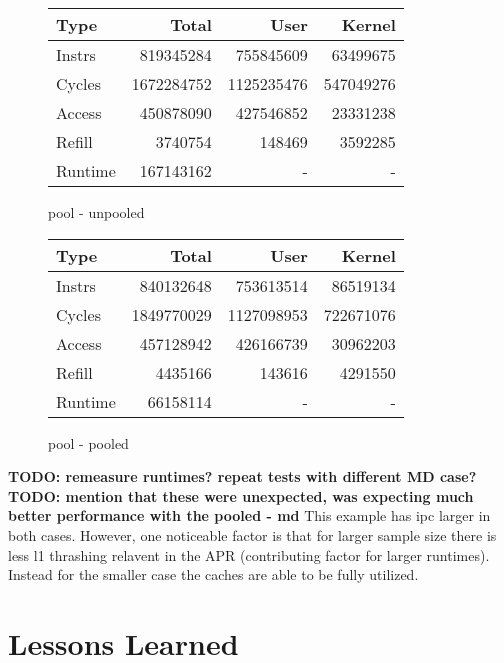 \documentclass[11pt]{article}
\begin{document}
\begin{figure*}[h]
	\begin{subtable}{.48\textwidth} 
		\centering
		\begin{tabular}{ l|rrr }
			Type    & Total      & User       & Kernel    \\
			\hline
			Instrs  & 819345284  & 755845609  & 63499675  \\
			Cycles  & 1672284752 & 1125235476 & 547049276 \\
			Access  & 450878090  & 427546852  & 23331238  \\
			Refill  & 3740754    & 148469     & 3592285   \\
			Runtime & 167143162  & -          & -         \\
			\hline
		\end{tabular}
		\caption{pool - unpooled}
	\end{subtable}
	\hfill
	\begin{subtable}{.48\textwidth} 
		\centering
		\begin{tabular}{ l|rrr }
			Type    & Total      & User       & Kernel    \\
			\hline
			Instrs  & 840132648  & 753613514  & 86519134  \\
			Cycles  & 1849770029 & 1127098953 & 722671076 \\
			Access  & 457128942  & 426166739  & 30962203  \\
			Refill  & 4435166    & 143616     & 4291550   \\
			Runtime & 66158114   & -          & -         \\
			\hline
		\end{tabular}
		\caption{pool - pooled}
	\end{subtable}
\end{figure*}

\textbf{TODO: remeasure runtimes? repeat tests with different MD case?}
\textbf{TODO: mention that these were unexpected, was expecting much better performance with the pooled - md}
This example has ipc larger in both cases.    However, one noticeable factor is that for larger sample size there is less l1 thrashing relavent in the APR (contributing factor for larger runtimes).  Instead for the smaller case the caches are able to be fully utilized.

\section{Lessons Learned}
\label{sec:lessons}
\end{document}
